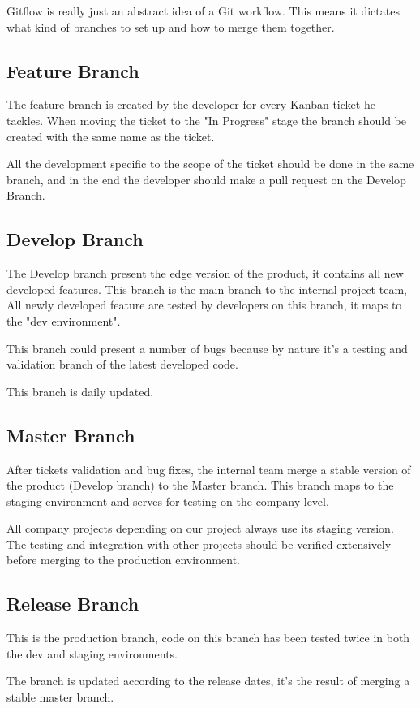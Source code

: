 \begin{spacing}{1.2}
Gitflow is really just an abstract idea of a Git workflow. This means it dictates what kind of branches to set up and how to merge them together.
\subsection{Feature Branch}
The feature branch is created by the developer for every Kanban ticket he tackles. When moving the ticket to the "In Progress" stage the branch should be created with the same name as the ticket.

All the development specific to the scope of the ticket should be done in the same branch, and in the end the developer should make a pull request on the Develop Branch.
\subsection{Develop Branch}
The Develop branch present the edge version of the product, it contains all new developed features. This branch is the main branch to the internal project team, All newly developed feature are tested by developers on this branch, it maps to the "dev environment".

This branch could present a number of bugs because by nature it's a testing and validation branch of the latest developed code.

This branch is daily updated.
\subsection{Master Branch}
After tickets validation and bug fixes, the internal team merge a stable version of the product (Develop branch) to the Master branch. This branch maps to the staging environment and serves for testing on the company level.

All company projects depending on our project always use its staging version. The testing and integration with other projects should be verified extensively before merging to the production environment.


\subsection{Release Branch}
This is the production branch, code on this branch has been tested twice in both the dev and staging environments.

The branch is updated according to the release dates, it's the result of merging a stable master branch.


\end{spacing}
